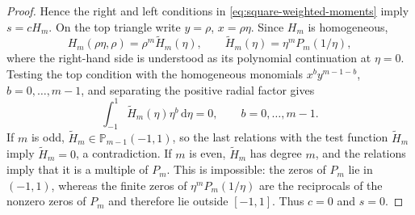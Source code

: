 \documentclass[review,hidelinks,onefignum,onetabnum]{siamart251216}
\begin{document}
\begin{proof}
Hence the right and left conditions in \eqref{eq:square-weighted-moments}
imply $s=cH_m$.  On the top triangle write
$y=\rho$, $x=\rho\eta$.  Since $H_m$ is homogeneous,
\[
 H_m(\rho\eta,\rho)=\rho^m\widetilde H_m(\eta),
 \qquad
 \widetilde H_m(\eta)=\eta^mP_m(1/\eta),
\]
where the right-hand side is understood as its polynomial continuation at
$\eta=0$.  Testing the top condition with the homogeneous monomials
$x^b y^{m-1-b}$, $b=0,\ldots,m-1$, and separating the positive radial
factor gives
\[
 \int_{-1}^1\widetilde H_m(\eta)\eta^b\,\mathrm d\eta=0,
 \qquad b=0,\ldots,m-1.
\]
If $m$ is odd, $\widetilde H_m\in\mathbb P_{m-1}(-1,1)$, so the last
relations with the test function $\widetilde H_m$ imply
$\widetilde H_m=0$, a contradiction.  If $m$ is even,
$\widetilde H_m$ has degree $m$, and the relations imply that it is a
multiple of $P_m$.  This is impossible: the zeros of $P_m$ lie in
$(-1,1)$, whereas the finite zeros of
$\eta^mP_m(1/\eta)$ are the reciprocals of the nonzero zeros of $P_m$ and
therefore lie outside $[-1,1]$.  Thus $c=0$ and $s=0$.
\end{proof}
\end{document}

